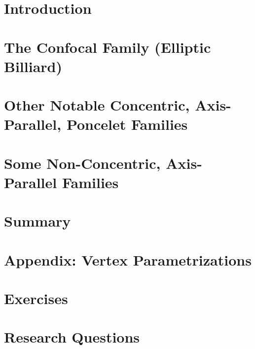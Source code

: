 \section{Introduction}
\label{sec:03-intro}


\section{The Confocal Family (Elliptic Billiard)}
\label{sec:03-billiard}


\section[More concentric Poncelet families]{Other Notable Concentric, Axis-Parallel, Poncelet Families}
\label{sec:03-other-conc}
 
 
\section{Some Non-Concentric, Axis-Parallel Families}
\label{sec:03-non-conc}
 

\section{Summary}
\label{sec:03-summary}


\section{Appendix: Vertex Parametrizations}
\label{sec:03-vtx-param}


\section{Exercises}
\label{sec:03-exercises}


\section{Research Questions}
\label{sec:03-research}

